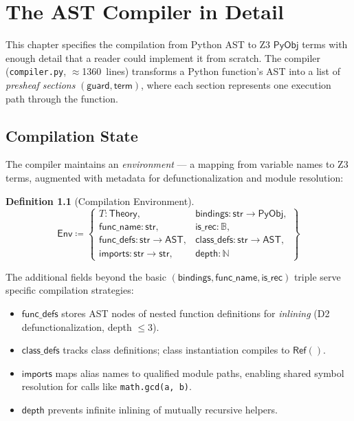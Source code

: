 \documentclass[11pt,a4paper]{report}
\theoremstyle{definition}
\newtheorem{definition}{Definition}[chapter]
\theoremstyle{plain}
\newcommand{\Nat}{\mathbb{N}}
\newcommand{\Bool}{\mathbb{B}}
\newcommand{\PyObj}{\mathsf{PyObj}}
\begin{document}
\chapter{The AST Compiler in Detail}
\label{ch:compiler-detail}

This chapter specifies the compilation from Python AST to Z3 $\PyObj$
terms with enough detail that a reader could implement it from scratch.
The compiler (\texttt{compiler.py}, $\approx$1360~lines) transforms
a Python function's AST into a list of \emph{presheaf sections}
$(\mathsf{guard}, \mathsf{term})$, where each section represents
one execution path through the function.

\section{Compilation State}

The compiler maintains an \emph{environment} --- a mapping from
variable names to Z3 terms, augmented with metadata for
defunctionalization and module resolution:

\begin{definition}[Compilation Environment]
\[
  \mathsf{Env} \coloneqq \left\{
  \begin{array}{ll}
    T : \mathsf{Theory}, &
      \mathsf{bindings} : \mathsf{str} \to \PyObj, \\
    \mathsf{func\_name} : \mathsf{str}, &
      \mathsf{is\_rec} : \Bool, \\
    \mathsf{func\_defs} : \mathsf{str} \to \mathsf{AST}, &
      \mathsf{class\_defs} : \mathsf{str} \to \mathsf{AST}, \\
    \mathsf{imports} : \mathsf{str} \to \mathsf{str}, &
      \mathsf{depth} : \Nat
  \end{array}\right\}
\]
\end{definition}

The additional fields beyond the basic $(\mathsf{bindings},
\mathsf{func\_name}, \mathsf{is\_rec})$ triple serve specific
compilation strategies:
\begin{itemize}
  \item $\mathsf{func\_defs}$ stores AST nodes of nested function
    definitions for \emph{inlining} (D2 defunctionalization, depth
    $\leq 3$).
  \item $\mathsf{class\_defs}$ tracks class definitions; class
    instantiation compiles to $\mathsf{Ref}()$.
  \item $\mathsf{imports}$ maps alias names to qualified module
    paths, enabling shared symbol resolution for calls like
    \texttt{math.gcd(a, b)}.
  \item $\mathsf{depth}$ prevents infinite inlining of mutually
    recursive helpers.
\end{itemize}
\end{document}
